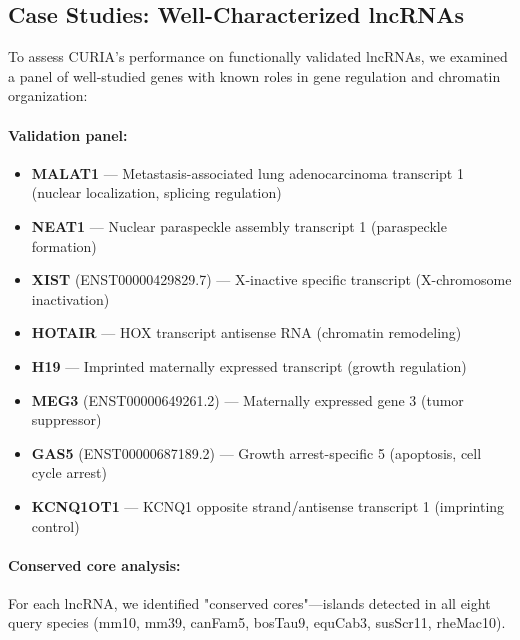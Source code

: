 \documentclass[11pt]{article}
\begin{document}
\subsection{Case Studies: Well-Characterized lncRNAs}

To assess CURIA's performance on functionally validated lncRNAs, we examined a panel of well-studied genes with known roles in gene regulation and chromatin organization:

\paragraph{Validation panel:}
\begin{itemize}
\item \textbf{MALAT1} — Metastasis-associated lung adenocarcinoma transcript 1 (nuclear localization, splicing regulation)
\item \textbf{NEAT1} — Nuclear paraspeckle assembly transcript 1 (paraspeckle formation)
\item \textbf{XIST} (ENST00000429829.7) — X-inactive specific transcript (X-chromosome inactivation)
\item \textbf{HOTAIR} — HOX transcript antisense RNA (chromatin remodeling)
\item \textbf{H19} — Imprinted maternally expressed transcript (growth regulation)
\item \textbf{MEG3} (ENST00000649261.2) — Maternally expressed gene 3 (tumor suppressor)
\item \textbf{GAS5} (ENST00000687189.2) — Growth arrest-specific 5 (apoptosis, cell cycle arrest)
\item \textbf{KCNQ1OT1} — KCNQ1 opposite strand/antisense transcript 1 (imprinting control)
\end{itemize}

\paragraph{Conserved core analysis:}
For each lncRNA, we identified "conserved cores"—islands detected in all eight query species (mm10, mm39, canFam5, bosTau9, equCab3, susScr11, rheMac10).
\end{document}
